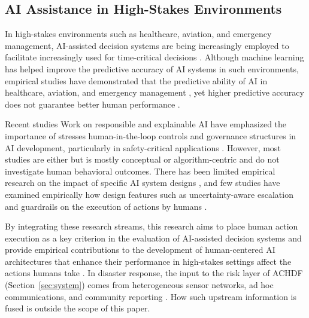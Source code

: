 \documentclass[journal]{IEEEtran}
\theoremstyle{plain}
\theoremstyle{definition}
\providecommand{\DIFaddtex}[1]{{\protect\color{blue} \sf #1}} %
\providecommand{\DIFdeltex}[1]{{\protect\color{red} \scriptsize #1}} %
\providecommand{\DIFaddbegin}{} %
\providecommand{\DIFaddend}{} %
\providecommand{\DIFdelbegin}{} %
\providecommand{\DIFdelend}{} %
\providecommand{\DIFadd}[1]{\texorpdfstring{\DIFaddtex{#1}}{#1}} %
\providecommand{\DIFdel}[1]{\texorpdfstring{\DIFdeltex{#1}}{}} %
\newcommand{\DIFscaledelfig}{0.5}
\newlength{\DIFdelgraphicswidth} %
\newlength{\DIFdelgraphicsheight} %
\newcommand{\DIFaddincludegraphics}[2][]{{\color{blue}\fbox{\DIFOincludegraphics[#1]{#2}}}} %
\newcommand{\DIFdelincludegraphics}[2][]{%
\sbox{\DIFdelgraphicsbox}{\DIFOincludegraphics[#1]{#2}}%
\settoboxwidth{\DIFdelgraphicswidth}{\DIFdelgraphicsbox} %
\settoboxtotalheight{\DIFdelgraphicsheight}{\DIFdelgraphicsbox} %
\scalebox{\DIFscaledelfig}{%
\parbox[b]{\DIFdelgraphicswidth}{\usebox{\DIFdelgraphicsbox}\\[-\baselineskip] \rule{\DIFdelgraphicswidth}{0em}}\llap{\resizebox{\DIFdelgraphicswidth}{\DIFdelgraphicsheight}{%
\setlength{\unitlength}{\DIFdelgraphicswidth}%
\begin{picture}(1,1)%
\thicklines\linethickness{2pt} %
{\color[rgb]{1,0,0}\put(0,0){\framebox(1,1){}}}%
{\color[rgb]{1,0,0}\put(0,0){\line( 1,1){1}}}%
{\color[rgb]{1,0,0}\put(0,1){\line(1,-1){1}}}%
\end{picture}%
}\hspace*{3pt}}} %
} %
\DeclareRobustCommand{\DIFaddbegin}{\DIFOaddbegin \let\includegraphics\DIFaddincludegraphics} %
\DeclareRobustCommand{\DIFaddend}{\DIFOaddend \let\includegraphics\DIFOincludegraphics} %
\DeclareRobustCommand{\DIFdelbegin}{\DIFOdelbegin \let\includegraphics\DIFdelincludegraphics} %
\DeclareRobustCommand{\DIFdelend}{\DIFOaddend \let\includegraphics\DIFOincludegraphics} %
\begin{document}
\subsection{AI Assistance in High-Stakes Environments}
\DIFdelbegin \DIFdel{In high-stakes environments such as healthcare, aviation, and emergency management, }\DIFdelend AI-assisted decision systems are \DIFdelbegin \DIFdel{being increasingly employed to facilitate }\DIFdelend \DIFaddbegin \DIFadd{increasingly used for }\DIFaddend time-critical decisions \DIFdelbegin \DIFdel{\cite{PerezCerrolaza2024CSUR,Bach2024Access,Rokhideh2025IJDRS,Rao2024IJDRS}. Although machine learning has helped improve the predictive accuracy of AI systems in such environments, empirical studies have demonstrated that the predictive ability of AI }\DIFdelend \DIFaddbegin \DIFadd{in healthcare, aviation, and emergency management \cite{PerezCerrolaza2024CSUR,Bach2024Access,Rokhideh2025IJDRS,Rao2024IJDRS}, yet higher predictive accuracy }\DIFaddend does not guarantee better human performance \cite{Lai2023FAccT,Yang2022THMSReview}. \DIFdelbegin %

\DIFdel{Recent studies }\DIFdelend \DIFaddbegin \DIFadd{Work }\DIFaddend on responsible and explainable AI \DIFdelbegin \DIFdel{have emphasized the importance of }\DIFdelend \DIFaddbegin \DIFadd{stresses }\DIFaddend human-in-the-loop controls \DIFdelbegin \DIFdel{and governance structures in AI development, particularly in safety-critical applications \cite{Weidinger2022FAccT,Assaad2023TAS,Miller2019XRDS,PerezCerrolaza2024CSUR} . However, most studies are either }\DIFdelend \DIFaddbegin \DIFadd{\cite{Weidinger2022FAccT,Assaad2023TAS,Miller2019XRDS,PerezCerrolaza2024CSUR} but is mostly }\DIFaddend conceptual or algorithm-centric\DIFdelbegin \DIFdel{and do not investigate human behavioral outcomes. There has been limited empirical research on the impact of specific AI system designs }\DIFdelend \DIFaddbegin \DIFadd{, and few studies have examined empirically how design features }\DIFaddend such as uncertainty-aware escalation and guardrails \DIFdelbegin \DIFdel{on the execution of actions by humans \cite{Bach2024Access,Lai2023FAccT}.
}%

\DIFdel{By integrating these research streams, this research aims to place human action execution as a key criterion in the evaluation of AI-assisted decision systems and provide empirical contributions to the development of human-centered AI architectures that enhance their performance in high-stakes settings \cite{Yang2022THMSReview,Bach2024Access}}\DIFdelend \DIFaddbegin \DIFadd{affect the actions humans take \cite{Bach2024Access,Lai2023FAccT}. In disaster response, the input to the risk layer of ACHDF (Section~\ref{sec:system}) comes from heterogeneous sensor networks, ad hoc communications, and community reporting \cite{Yang2005MobiHoc,Longo2025PMC}. How such upstream information is fused is outside the scope of this paper}\DIFaddend .
\end{document}
